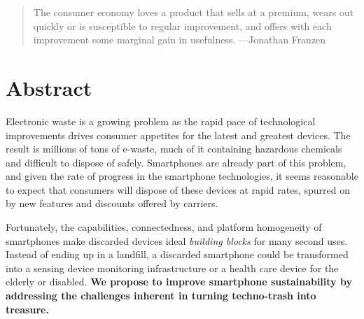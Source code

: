 \begin{quote}
The consumer economy loves a product that sells at a premium, wears
out quickly or is susceptible to regular improvement, and offers with each
improvement some marginal gain in usefulness.
\hfill---Jonathan Franzen
\end{quote}

\section*{Abstract}

Electronic waste is a growing problem as the rapid pace of technological
improvements drives consumer appetites for the latest and greatest devices.
The result is millions of tons of e-waste, much of it containing hazardous
chemicals and difficult to dispose of safely. Smartphones are already part of
this problem, and given the rate of progress in the smartphone technologies,
it seems reasonable to expect that consumers will dispose of these devices at
rapid rates, spurred on by new features and discounts offered by carriers.

Fortunately, the capabilities, connectedness, and platform homogeneity of
smartphones make discarded devices ideal \textit{building blocks} for many
second uses. Instead of ending up in a landfill, a discarded smartphone could
be transformed into a sensing device monitoring infrastructure or a health
care device for the elderly or disabled. \textbf{We propose to improve
smartphone sustainability by addressing the challenges inherent in turning
techno-trash into treasure.}
